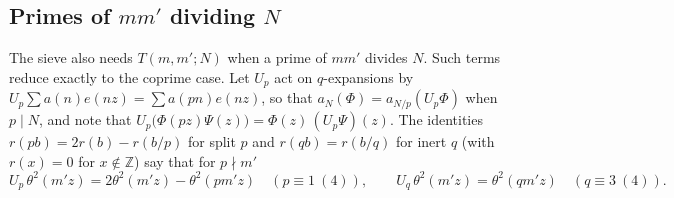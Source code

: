 \documentclass[11pt]{amsart}
\theoremstyle{remark}
\newcommand{\Z}{\mathbb{Z}}
\begin{document}
\subsection{Primes of $mm'$ dividing $N$}\label{subsec:reduce}
The sieve also needs $T(m,m';N)$ when a prime of $mm'$ divides $N$. Such terms reduce exactly to the coprime case. Let $U_p$ act on $q$-expansions by $U_p\sum a(n)e(nz)=\sum a(pn)e(nz)$, so that $a_{N}(\Phi)=a_{N/p}(U_p\Phi)$ when $p\mid N$, and note that $U_p\bigl(\Phi(pz)\Psi(z)\bigr)=\Phi(z)\,(U_p\Psi)(z)$. The identities $r(pb)=2r(b)-r(b/p)$ for split $p$ and $r(qb)=r(b/q)$ for inert $q$ (with $r(x)=0$ for $x\notin\Z$) say that for $p\nmid m'$
\begin{equation}\label{eq:Up}
U_p\,\theta^2(m'z)=2\theta^2(m'z)-\theta^2(pm'z)\quad(p\equiv1\ (4)),\qquad
U_q\,\theta^2(m'z)=\theta^2(qm'z)\quad(q\equiv3\ (4)).
\end{equation}
\end{document}
